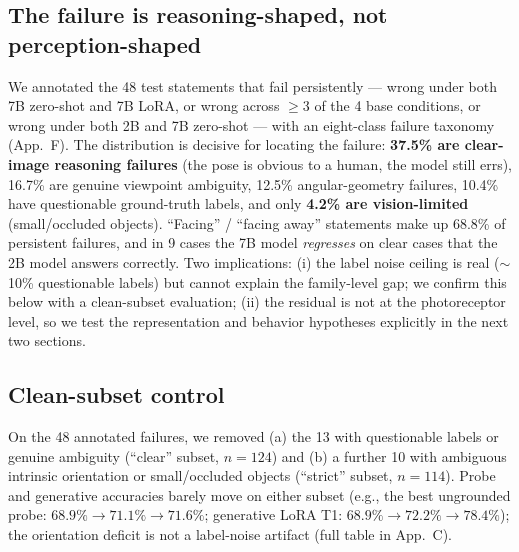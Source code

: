 \subsection{The failure is reasoning-shaped, not perception-shaped}
We annotated the 48 test statements that fail persistently --- wrong under
both 7B zero-shot and 7B LoRA, or wrong across $\geq$3 of the 4 base
conditions, or wrong under both 2B and 7B zero-shot --- with an
eight-class failure taxonomy (App.~F). The distribution is
decisive for locating the failure:
\textbf{37.5\% are clear-image reasoning failures} (the pose is obvious to a
human, the model still errs), 16.7\% are genuine viewpoint ambiguity, 12.5\%
angular-geometry failures, 10.4\% have questionable ground-truth labels, and only
\textbf{4.2\% are vision-limited} (small/occluded objects). ``Facing'' /
``facing away'' statements make up 68.8\% of persistent failures, and in 9 cases
the 7B model \emph{regresses} on clear cases that the 2B model answers correctly.
Two implications: (i) the label noise ceiling is real ($\sim$10\% questionable
labels) but cannot explain the family-level gap; we confirm this below with a
clean-subset evaluation; (ii) the residual is not at the photoreceptor level, so
we test the representation and behavior hypotheses explicitly in the next two
sections.

\subsection{Clean-subset control}
On the 48 annotated failures, we removed (a) the 13 with questionable labels or
genuine ambiguity (``clear'' subset, $n{=}124$) and (b) a further 10 with
ambiguous intrinsic orientation or small/occluded objects (``strict'' subset,
$n{=}114$). Probe and generative accuracies barely move on either subset
(e.g., the best ungrounded probe: $68.9\% \rightarrow 71.1\% \rightarrow 71.6\%$;
generative LoRA T1: $68.9\% \rightarrow 72.2\% \rightarrow 78.4\%$); the
orientation deficit is not a label-noise artifact (full table in
App.~C).
